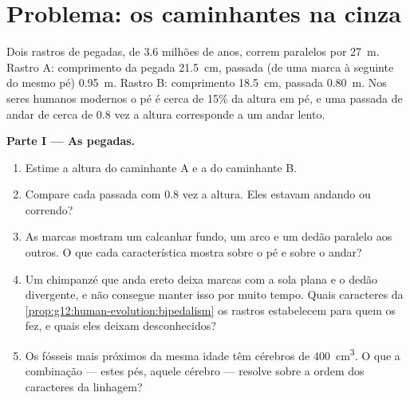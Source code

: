 \section{Problema: os caminhantes na cinza}

\begin{problem}
\label{pb:g12:human-evolution:1}
Dois rastros de pegadas, de 3.6 milhões de anos, correm paralelos por
\qty{27}{m}. Rastro A: comprimento da pegada \qty{21.5}{cm}, passada
(de uma marca à seguinte do mesmo pé) \qty{0.95}{m}. Rastro B:
comprimento \qty{18.5}{cm}, passada \qty{0.80}{m}. Nos seres humanos
modernos o pé é cerca de 15\% da altura em pé, e uma passada de andar
de cerca de 0.8 vez a altura corresponde a um andar lento.

\medskip
\noindent\textbf{Parte I --- As pegadas.}
\begin{enumerate}
  \item Estime a altura do caminhante A e a do caminhante B.
  \item Compare cada passada com 0.8 vez a altura. Eles estavam
        andando ou correndo?
  \item As marcas mostram um calcanhar fundo, um arco e um dedão
        paralelo aos outros. O que cada característica mostra sobre o
        pé e sobre o andar?
  \item Um chimpanzé que anda ereto deixa marcas com a sola plana e o
        dedão divergente, e não consegue manter isso por muito tempo.
        Quais caracteres da \cref{prop:g12:human-evolution:bipedalism}
        os rastros estabelecem para quem os fez, e quais eles deixam
        desconhecidos?
  \item Os fósseis mais próximos da mesma idade têm cérebros de
        \qty{400}{cm^3}. O que a combinação --- estes pés, aquele
        cérebro --- resolve sobre a ordem dos caracteres da linhagem?
\end{enumerate}


\end{problem}
